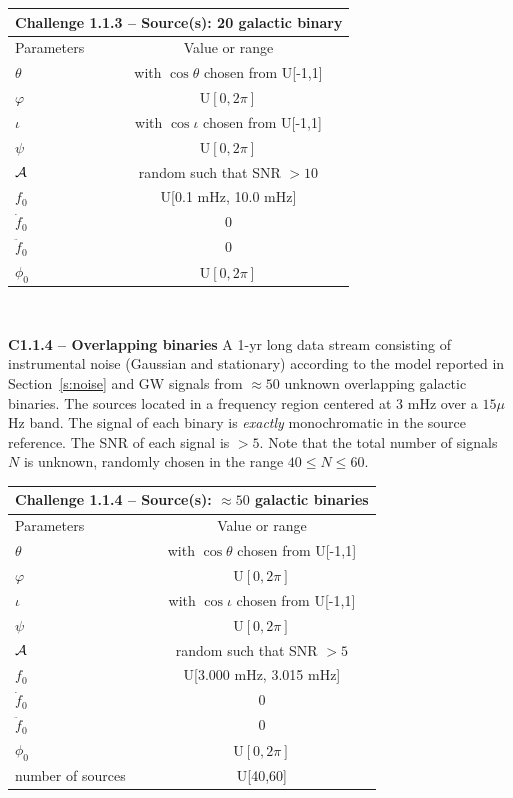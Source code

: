 \documentclass[11pt]{report}
\begin{document}
\begin{description}
\begin{center}
\begin{tabular}{l|c}
\hline \hline
\multicolumn{2}{c}{{\bf Challenge 1.1.3 -- Source(s): 20 galactic binary}} \\
\hline
Parameters & Value or range \\
\hline
$\theta$          & with $\cos\theta$ chosen from U[-1,1]\\
$\varphi$         & U$[0,2\pi]$ \\ 
$\iota$           & with $\cos\iota$ chosen from U[-1,1]\\ 
$\psi$            & U$[0,2\pi]$ \\
${\cal A}$        & random such that SNR $> 10$  \\
$f_0$             & U[0.1 mHz, 10.0 mHz] \\ 
$\dot{f}_0$       & 0 \\ 
$\ddot{f}_0$      & 0\\ 
$\phi_0$          & U$[0,2\pi]$ \\
\hline \hline
\end{tabular} \\
\end{center}

\item {\bf C1.1.4 -- Overlapping binaries} A 1-yr long data stream consisting of instrumental noise (Gaussian and stationary) according to the model reported in Section~\ref{s:noise} and GW signals from $\approx 50$ unknown overlapping galactic binaries. The sources located in a frequency region centered at 3 mHz over a $15 \mu$Hz band. The signal of each binary is {\em exactly} monochromatic in the source reference. The SNR of each signal is $> 5$. Note that the total number of signals $N$ is unknown, randomly chosen in the range $40 \le N \le 60$.

\begin{center}
\begin{tabular}{l|c}
\hline \hline
\multicolumn{2}{c}{{\bf Challenge 1.1.4 -- Source(s): $\approx 50$ galactic binaries}} \\
\hline
Parameters & Value or range \\
\hline
$\theta$          & with $\cos\theta$ chosen from U[-1,1]\\
$\varphi$         & U$[0,2\pi]$ \\ 
$\iota$           & with $\cos\iota$ chosen from U[-1,1]\\ 
$\psi$            & U$[0,2\pi]$ \\
${\cal A}$        & random such that SNR $> 5$  \\
$f_0$             & U[3.000 mHz, 3.015 mHz] \\ 
$\dot{f}_0$       & 0 \\ 
$\ddot{f}_0$      & 0\\ 
$\phi_0$          & U$[0,2\pi]$ \\
number of sources & U[40,60] \\
\hline \hline
\end{tabular} \\
\end{center}



\end{description}
\end{document}
